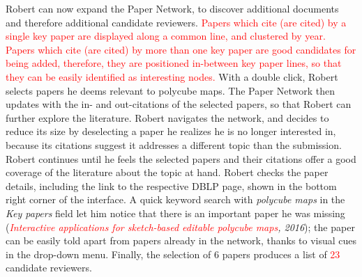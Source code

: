 Robert can now expand the Paper Network, to discover additional documents and therefore additional candidate reviewers. \textcolor{red}{Papers which cite (are cited) by a single key paper are displayed along a common line, and clustered by year. Papers which cite (are cited) by more than one key paper are good candidates for being added, therefore, they are positioned in-between key paper lines, so that they can be easily identified as interesting nodes.} With a double click, Robert selects  papers he deems relevant to polycube maps. The Paper Network then updates with the in- and out-citations of the selected papers, so that Robert can further explore the literature. Robert navigates the network, and decides to reduce its size by deselecting a paper he realizes he is no longer interested in, because its citations suggest it addresses a different topic than the submission. %
Robert continues until he feels the selected papers and their citations offer a good coverage of the literature about the topic at hand. Robert checks the paper details, including the link to the respective DBLP page, shown in the bottom right corner of the interface. A quick keyword search with \emph{polycube maps} in the \emph{Key papers} field let him notice that there is an important paper he was missing (\emph{\textcolor{red}{Interactive applications for sketch-based editable polycube maps}, 2016}); the paper can be easily told apart from papers already in the network, thanks to visual cues in the drop-down menu. Finally, the selection of 6 papers produces a list of \textcolor{red}{23} candidate reviewers. 


